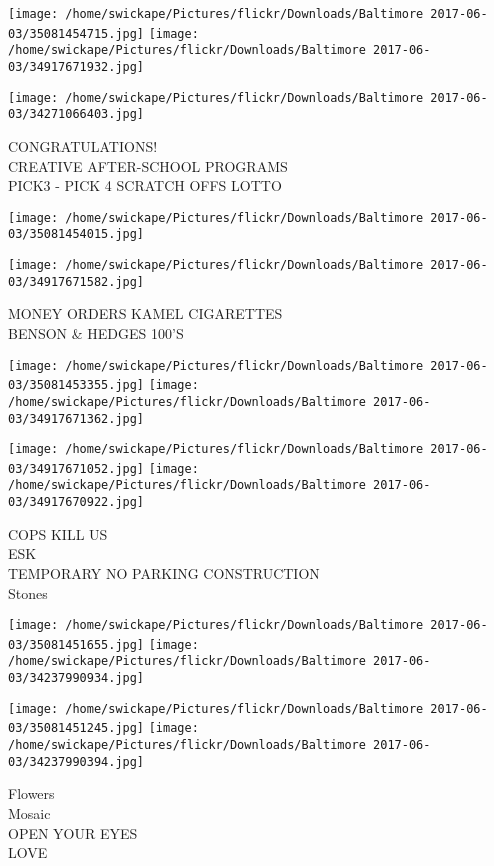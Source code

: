 \documentclass[10pt,letterpaper]{article}
\begin{document}
\texttt{[image: /home/swickape/Pictures/flickr/Downloads/Baltimore 2017-06-03/35081454715.jpg]}
\texttt{[image: /home/swickape/Pictures/flickr/Downloads/Baltimore 2017-06-03/34917671932.jpg]}

\texttt{[image: /home/swickape/Pictures/flickr/Downloads/Baltimore 2017-06-03/34271066403.jpg]}

CONGRATULATIONS!\\
CREATIVE AFTER{-}SCHOOL PROGRAMS\\
PICK3 {-} PICK 4 SCRATCH OFFS LOTTO\\
\pagebreak

\texttt{[image: /home/swickape/Pictures/flickr/Downloads/Baltimore 2017-06-03/35081454015.jpg]}

\vspace{0.25in}
\texttt{[image: /home/swickape/Pictures/flickr/Downloads/Baltimore 2017-06-03/34917671582.jpg]}

MONEY ORDERS KAMEL CIGARETTES\\
BENSON \& HEDGES 100'S\\
\pagebreak

\texttt{[image: /home/swickape/Pictures/flickr/Downloads/Baltimore 2017-06-03/35081453355.jpg]}
\texttt{[image: /home/swickape/Pictures/flickr/Downloads/Baltimore 2017-06-03/34917671362.jpg]}

\texttt{[image: /home/swickape/Pictures/flickr/Downloads/Baltimore 2017-06-03/34917671052.jpg]}
\texttt{[image: /home/swickape/Pictures/flickr/Downloads/Baltimore 2017-06-03/34917670922.jpg]}

COPS KILL US\\
ESK\\
TEMPORARY NO PARKING CONSTRUCTION\\
Stones\\
\pagebreak

\texttt{[image: /home/swickape/Pictures/flickr/Downloads/Baltimore 2017-06-03/35081451655.jpg]}
\texttt{[image: /home/swickape/Pictures/flickr/Downloads/Baltimore 2017-06-03/34237990934.jpg]}

\texttt{[image: /home/swickape/Pictures/flickr/Downloads/Baltimore 2017-06-03/35081451245.jpg]}
\texttt{[image: /home/swickape/Pictures/flickr/Downloads/Baltimore 2017-06-03/34237990394.jpg]}

Flowers\\
Mosaic\\
OPEN YOUR EYES\\
LOVE\\
\pagebreak
\end{document}
